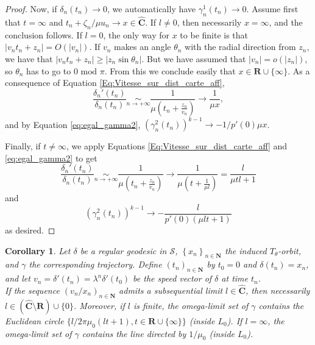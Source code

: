 \documentclass[11pt]{article}
\newcommand{\isEquivTo}[1]{\underset{#1}{\sim}}
\newtheorem{cor}[thm]{Corollary}
\begin{document}
\begin{proof}
Now, if $\delta_{n}\left(t_{n}\right)\rightarrow0$, we automatically have $\gamma_{n}^{1}(t_{n})\rightarrow0$. Assume first that $t=\infty$ and $t_{n}+\zeta_{n}/\mu u_{n}\rightarrow x\in\widehat{\mathbf{C}}$. If $l\neq0$, then necessarily $x=\infty$, and the conclusion follows. If $l=0$, the only way for $x$ to be finite is that $\lvert v_{n}t_{n}+z_{n}\rvert=O(\lvert v_{n}\rvert)$. If $v_{n}$ makes an angle $\theta_{n}$ with the radial direction from $z_{n}$, we have that $\lvert v_{n}t_{n}+z_{n}\rvert\geq\lvert z_{n}\sin\theta_{n}\rvert$. But we have assumed that $\lvert v_{n}\rvert=o(\lvert z_{n}\rvert)$, so $\theta_{n}$ has to go to $0\text{ mod }\pi$. From this we conclude easily that $x\in\mathbf{R}\cup\{\infty\}$. As a consequence of Equation \ref{Eq:Vitesse_sur_dist_carte_aff}, 
\[
\frac{\delta_{n}'\left(t_{n}\right)}{\delta_{n}\left(t_{n}\right)}\isEquivTo{n\rightarrow+\infty}\frac{1}{\displaystyle\mu\left(t_{n}+\frac{z_{n}}{v_{n}}\right)}\longrightarrow\frac{1}{\displaystyle\mu x},
\]
and by Equation \ref{eq:egal_gamma2}, $\left(\gamma_{n}^{2}(t_{n})\right)^{k-1}\rightarrow-1/p'(0)\mu x$.

Finally, if $t\neq\infty$, we apply Equations \ref{Eq:Vitesse_sur_dist_carte_aff} and \ref{eq:egal_gamma2} to get
\[
\frac{\delta_{n}'\left(t_{n}\right)}{\delta_{n}\left(t_{n}\right)}\isEquivTo{n\rightarrow+\infty}\frac{1}{\displaystyle\mu\left(t_{n}+\frac{z_{n}}{v_{n}}\right)}\longrightarrow\frac{1}{\displaystyle\mu\left(t+\frac{1}{\mu l}\right)}=\frac{l}{\mu tl+1}
\]
and
\[
\left(\gamma_{n}^{2}(t_{n})\right)^{k-1}\longrightarrow-\frac{l}{p'(0)(\mu lt+1)}
\]
as desired.
\end{proof}

\begin{cor}
\label{cor:cercle_limite}
    Let $\delta$ be a regular geodesic in $\mathcal{S}$, $\left\{x_{n}\right\}_{n\in\mathbf{N}}$ the induced $T_{\theta}$-orbit, and $\gamma$ the corresponding trajectory. Define $\left(t_{n}\right)_{n\in\mathbf{N}}$ by $t_{0}=0$ and $\delta(t_{n})=x_{n}$, and let $v_{n}=\delta'(t_{n})=\lambda^{n}\delta'(t_{0})$ be the speed vector of $\delta$ at time $t_{n}$.\\
    If the sequence $(v_{n}/x_{n})_{n\in\mathbf{N}}$ admits a subsequential limit $l\in\widehat{\mathbf{C}}$, then necessarily $l\in(\widehat{\mathbf{C}}\setminus\mathbf{R})\cup\{0\}$. Moreover, if $l$ is finite, the omega-limit set of $\gamma$ contains the Euclidean circle $\{l/2\pi\mu_{0}(lt+1),t\in\mathbf{R}\cup\{\infty\}\}$ (inside $L_{0}$). If $l=\infty$, the omega-limit set of $\gamma$ contains the line directed by $1/\mu_{0}$ (inside $L_{0}$).
\end{cor}
\end{document}
